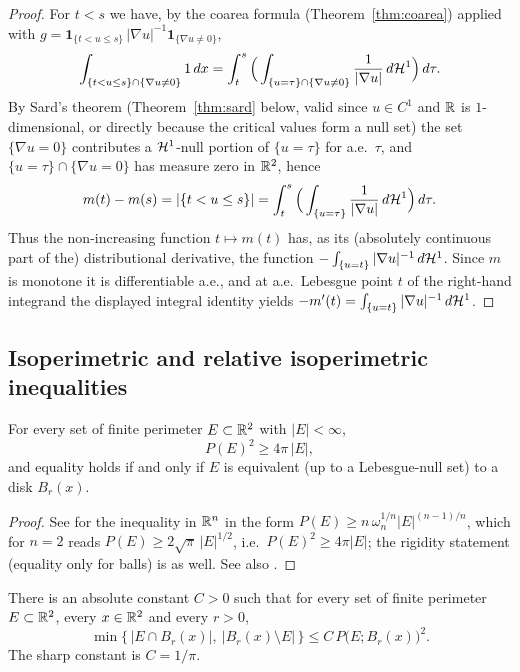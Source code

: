 \begin{proof}
For $t<s$ we have, by the coarea formula (Theorem~\ref{thm:coarea}) applied
with $g=\mathbf 1_{\{t<u\le s\}}\,|\nabla u|^{-1}\mathbf 1_{\{\nabla u\ne0\}}$,
\[
  \int_{\{t<u\le s\}\cap\{\nabla u\ne0\}}1\,dx
  =\int_t^s\Big(\int_{\{u=\tau\}\cap\{\nabla u\ne0\}}\frac{1}{|\nabla u|}\,
  d\mathcal{H}^1\Big)\,d\tau .
\]
By Sard's theorem (Theorem~\ref{thm:sard} below, valid since $u\in C^1$ and
$\mathbb{R}$ is $1$-dimensional, or directly because the critical values form a null
set) the set $\{\nabla u=0\}$ contributes a $\mathcal{H}^1$-null portion of
$\{u=\tau\}$ for a.e.\ $\tau$, and $\{u=\tau\}\cap\{\nabla u=0\}$ has measure
zero in $\mathbb{R}^2$, hence
\[
  m(t)-m(s)=|\{t<u\le s\}|
  =\int_t^s\Big(\int_{\{u=\tau\}}\frac{1}{|\nabla u|}\,d\mathcal{H}^1\Big)\,d\tau .
\]
Thus the non-increasing function $t\mapsto m(t)$ has, as its
(absolutely continuous part of the) distributional derivative, the function
$-\int_{\{u=t\}}|\nabla u|^{-1}\,d\mathcal{H}^1$. Since $m$ is monotone it is
differentiable a.e., and at a.e.\ Lebesgue point $t$ of the right-hand
integrand the displayed integral identity yields
$-m'(t)=\int_{\{u=t\}}|\nabla u|^{-1}\,d\mathcal{H}^1$.
\end{proof}

\subsection{Isoperimetric and relative isoperimetric inequalities}
\label{ss:isoperimetric}

\begin{theorem}\label{thm:isoperimetric}
For every set of finite perimeter $E\subset\mathbb{R}^2$ with $|E|<\infty$,
\[
  P(E)^2\ge 4\pi\,|E|,
\]
and equality holds if and only if $E$ is equivalent (up to a Lebesgue-null
set) to a disk $B_r(x)$.
\end{theorem}

\begin{proof}
See \cite[Theorem~14.1]{Maggi2012} for the inequality in $\mathbb{R}^n$ in the form
$P(E)\ge n\,\omega_n^{1/n}|E|^{(n-1)/n}$, which for $n=2$ reads
$P(E)\ge 2\sqrt{\pi}\,|E|^{1/2}$, i.e.\ $P(E)^2\ge 4\pi|E|$; the rigidity
statement (equality only for balls) is \cite[Theorem~14.1]{Maggi2012} as
well. See also \cite[Section~5.6.2, Theorem~5.6]{EvansGariepy2015}.
\end{proof}

\begin{theorem}
\label{thm:relative-isoperimetric}
There is an absolute constant $C>0$ such that for every set of finite
perimeter $E\subset\mathbb{R}^2$, every $x\in\mathbb{R}^2$ and every $r>0$,
\[
  \min\big\{\,|E\cap B_r(x)|,\ |B_r(x)\setminus E|\,\big\}
  \le C\,P\big(E;B_r(x)\big)^2 .
\]
The sharp constant is $C=1/\pi$.
\end{theorem}

